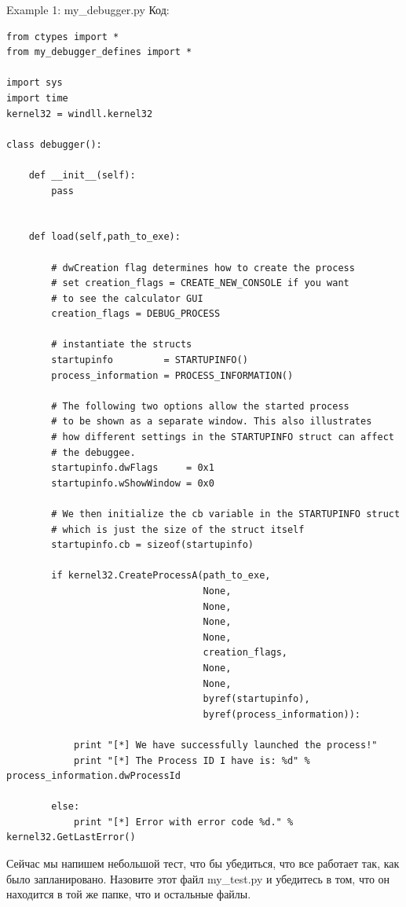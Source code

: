\documentclass[12pt, a4paper, oneside]{book}
\begin{document}
Example 1: my\_debugger.py
Код:
\begin{verbatim}
from ctypes import *
from my_debugger_defines import *

import sys
import time
kernel32 = windll.kernel32

class debugger():

    def __init__(self):
        pass
                
                
    def load(self,path_to_exe):
        
        # dwCreation flag determines how to create the process
        # set creation_flags = CREATE_NEW_CONSOLE if you want
        # to see the calculator GUI
        creation_flags = DEBUG_PROCESS
    
        # instantiate the structs
        startupinfo         = STARTUPINFO()
        process_information = PROCESS_INFORMATION()
        
        # The following two options allow the started process
        # to be shown as a separate window. This also illustrates
        # how different settings in the STARTUPINFO struct can affect
        # the debuggee.
        startupinfo.dwFlags     = 0x1
        startupinfo.wShowWindow = 0x0
        
        # We then initialize the cb variable in the STARTUPINFO struct
        # which is just the size of the struct itself
        startupinfo.cb = sizeof(startupinfo)
        
        if kernel32.CreateProcessA(path_to_exe,
                                   None,
                                   None,
                                   None,
                                   None,
                                   creation_flags,
                                   None,
                                   None,
                                   byref(startupinfo),
                                   byref(process_information)):
            
            print "[*] We have successfully launched the process!"
            print "[*] The Process ID I have is: %d" % process_information.dwProcessId
          
        else:    
            print "[*] Error with error code %d." % kernel32.GetLastError()
\end{verbatim}

Сейчас мы напишем небольшой тест, что бы убедиться, что все работает так, как было запланировано. Назовите этот файл my\_test.py и убедитесь в том, что он находится в той же папке, что и остальные файлы.
\end{document}
